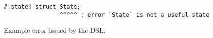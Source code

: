 \begin{listing}
    \centering
    \begin{verbatim}
#[state] struct State;
                ^^^^^ : error `State` is not a useful state
    \end{verbatim}
    \caption{
        Example error issued by the DSL.
    }
    \label{lst:dsl-typestate-error}
\end{listing}
